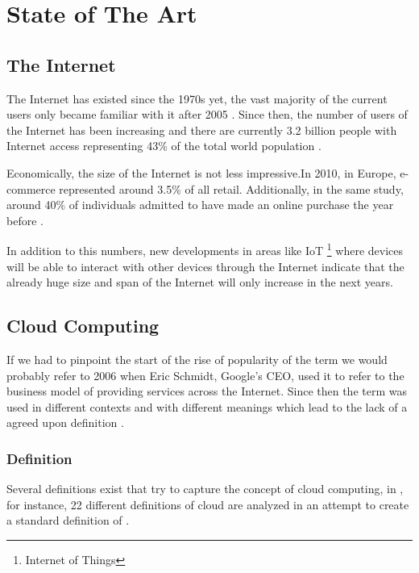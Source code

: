 \chapter{State of The Art} \label{chap:stateoftheart}
    \section{The Internet} \label{chap:stateoftheart:sec:internet}

    The Internet has existed since the 1970s yet, the vast majority of the current users only became familiar with it after 2005 \cite{Guangming2011}. Since then, the number of users of the Internet has been increasing and there are currently 3.2 billion people with Internet access representing 43\% of the total world population \cite{SANOU2015}.

    Economically, the size of the Internet is not less impressive.In 2010, in Europe, e-commerce represented around 3.5\% of all retail. Additionally, in the same study, around 40\% of individuals admitted to have made an online purchase the year before \cite{EuropeanCommission2012}.

    In addition to this numbers, new developments in areas like IoT \footnote{Internet of Things} where devices will be able to interact with other devices through the Internet \cite{Suresh2014} indicate that the already huge size and span of the Internet will only increase in the next years.


    \section{Cloud Computing} \label{chap:stateoftheart:sec:cloud}
    	If we had to pinpoint the start of the rise of popularity of the term  we would probably refer to 2006 when Eric Schmidt, Google's CEO, used it to refer to the business model of providing services across the Internet\cite{Zhang2010}.  Since then the term was used in different contexts and with different meanings which lead to the lack of a agreed upon definition \cite{Zhang2010}.
    
    
    	\subsection{Definition} \label{chap:stateoftheheart:sec:cloud:sec:definition}
        Several definitions exist that try to capture the concept of cloud computing, in  \cite{Vaquero2008}, for instance, 22 different definitions of cloud are analyzed in an attempt to create a standard definition of . 
        
